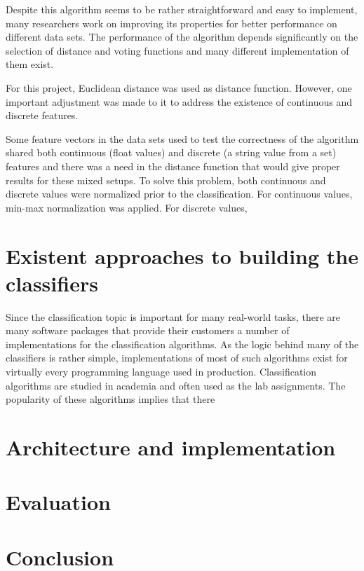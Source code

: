 \documentclass{llncs}
\begin{document}
Despite this algorithm seems to be rather straightforward and easy to implement, many researchers work on improving its properties for better performance on different data sets. The performance of the algorithm depends significantly on the selection of distance and voting functions and many different implementation of them exist.

For this project, Euclidean distance was used as distance function. However, one important adjustment was made to it to address the existence of continuous and discrete features. 

Some feature vectors in the data sets used to test the correctness of the algorithm shared both continuous (float values) and discrete (a string value from a set) features and there was a need in the distance function that would give proper results for these mixed setups. To solve this problem, both continuous and discrete values were normalized prior to the classification. For continuous values, min-max normalization was applied. For discrete values, 


\section{Existent approaches to building the classifiers}

Since the classification topic is important for many real-world tasks, there are many software packages that provide their customers a number of implementations for the classification algorithms. As the logic behind many of the classifiers is rather simple, implementations of most of such algorithms exist for virtually every programming language used in production. Classification algorithms are studied in academia and often used as the lab assignments. The popularity of these algorithms implies that there 

\section{Architecture and implementation}


\section{Evaluation}

\section{Conclusion}
\end{document}
